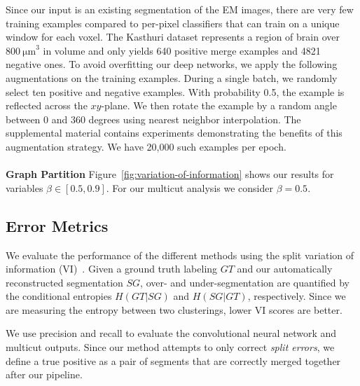 Since our input is an existing segmentation of the EM images, there are very few training examples compared to per-pixel classifiers that can train on a unique window for each voxel. 
The Kasthuri dataset represents a region of brain over $\SI[product-units=single]{800}{\micro\meter}^3$ in volume and only yields 640 positive merge examples and 4821 negative ones.
To avoid overfitting our deep networks, we apply the following augmentations on the training examples.
During a single batch, we randomly select ten positive and negative examples. 
With probability 0.5, the example is reflected across the $xy$-plane. 
We then rotate the example by a random angle between $0$ and $360$ degrees using nearest neighbor interpolation. 
The supplemental material contains experiments demonstrating the benefits of this augmentation strategy.
We have 20,000 such examples per epoch.
\\~\\
\noindent\textbf{Graph Partition}
Figure~\ref{fig:variation-of-information} shows our results for variables $\beta \in [0.5, 0.9]$. 
For our multicut analysis we consider $\beta = 0.5$. 

\subsection{Error Metrics}
\label{sec:variation-of-information}
We evaluate the performance of the different methods using the split variation of information (VI)~\cite{meila2003comparing}.
Given a ground truth labeling $GT$ and our automatically reconstructed segmentation $SG$, over- and under-segmentation are quantified by the conditional entropies $H(GT | SG)$ and $H(SG | GT)$, respectively. 
Since we are measuring the entropy between two clusterings, lower VI scores are better.

We use precision and recall to evaluate the convolutional neural network and multicut outputs. 
Since our method attempts to only correct \textit{split errors}, we define a true positive as a pair of segments that are correctly merged together after our pipeline.
